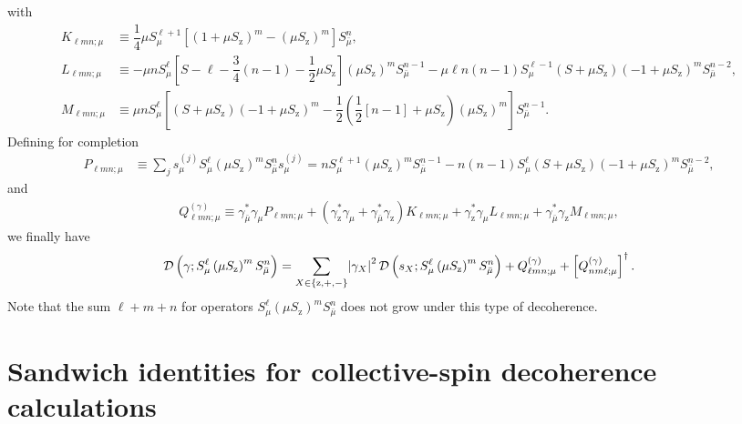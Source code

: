 \documentclass[pra,reprint,longbibliography]{revtex4-1}
\newcommand{\f}[2]{\dfrac{#1}{#2}} %
\newcommand{\p}[1]{\left(#1\right)} %
\renewcommand{\sp}[1]{\left[#1\right]} %
\renewcommand{\set}[1]{\left\{#1\right\}} %
\newcommand{\D}{\mathcal{D}}
\newcommand{\z}{\text{z}}
\newcommand{\bmu}{{\bar\mu}}
\newcommand{\1}{\mathds{1}}
\begin{document}
with
\begin{align}
  K_{\ell mn;\mu}
  &\equiv \f14 \mu S_\mu^{\ell+1}
  \sp{\p{1+\mu S_\z}^m-\p{\mu S_\z}^m} S_\bmu^n, \\
  L_{\ell mn;\mu}
  &\equiv -\mu n S_\mu^\ell \sp{S-\ell-\f34\p{n-1}-\f12\mu S_\z}
  \p{\mu S_\z}^m S_\bmu^{n-1}
  - \mu\ell n\p{n-1} S_\mu^{\ell-1}
  \p{S+\mu S_\z} \p{-1+\mu S_\z}^m S_\bmu^{n-2}, \\
  M_{\ell mn;\mu}
  &\equiv \mu n S_\mu^\ell \sp{\p{S+\mu S_\z}\p{-1+\mu S_\z}^m
    - \f12\p{\f12\sp{n-1}+\mu S_\z}\p{\mu S_\z}^m} S_\bmu^{n-1}.
\end{align}
Defining for completion
\begin{align}
  P_{\ell mn;\mu}
  &\equiv \sum_j s_\mu^{(j)} S_\mu^\ell
  \p{\mu S_\z}^m S_\bmu^n s_\mu^{(j)}
  = n S_\mu^{\ell+1} \p{\mu S_\z}^m S_\bmu^{n-1}
  - n\p{n-1} S_\mu^\ell \p{S+\mu S_\z} \p{-1+\mu S_\z}^m S_\bmu^{n-2},
\end{align}
and
\begin{align}
  Q_{\ell mn;\mu}^{(\gamma)}
  \equiv \gamma_\bmu^* \gamma_\mu P_{\ell mn;\mu}
  + \p{\gamma_\z^* \gamma_\mu + \gamma_\bmu^* \gamma_\z}
  K_{\ell mn;\mu}
  + \gamma_\z^* \gamma_\mu L_{\ell mn;\mu}
  + \gamma_\bmu^* \gamma_\z M_{\ell mn;\mu},
  \label{eq:Q_single}
\end{align}
we finally have
\begin{align}
  \D\p{\gamma; S_\mu^\ell \p{\mu S_\z}^m S_\bmu^n}
  = \sum_{X\in\set{\z,+,-}} \abs{\gamma_X}^2
  \D\p{s_X; S_\mu^\ell \p{\mu S_\z}^m S_\bmu^n}
  + Q_{\ell mn;\mu}^{(\gamma)} + \sp{Q_{nm\ell;\mu}^{(\gamma)}}^\dag.
\end{align}
Note that the sum $\ell+m+n$ for operators
$S_\mu^\ell \p{\mu S_\z}^m S_\bmu^n$ does not grow under this type of
decoherence.


\section{Sandwich identities for collective-spin decoherence
  calculations}
\label{sec:sandwich_collective}
\end{document}
